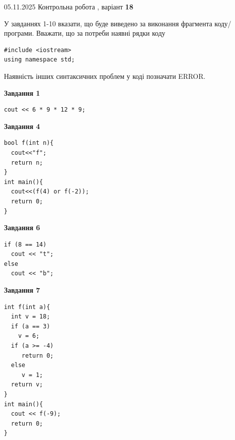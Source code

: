 \documentclass[12pt, ukrainian]{article}
\begin{document}
{\Large{05.11.2025 Контрольна робота , варіант  \No \textbf { 18 }\par}}
{
\begin {large}
У завданнях 1-10 вказати, що буде виведено за виконання фрагмента коду/про\-гра\-ми.
Вважати, що за потреби наявні рядки коду
\begin{verbatim}
#include <iostream>
using namespace std;
\end{verbatim}
Наявність інших синтаксичних проблем у коді позначати ERROR.

\begin{minipage}[t]{7.0cm}

\begin{center}
\textbf{Завдання 1}
\end{center}
\vspace{-8mm}

\begin{verbatim}
cout << 6 * 9 * 12 * 9;
\end{verbatim}



\begin{center}
\textbf{Завдання 4}
\end{center}
\vspace{-8mm}

\begin{verbatim}
bool f(int n){
  cout<<"f";
  return n;
}
int main(){
  cout<<(f(4) or f(-2));
  return 0;
}
\end{verbatim}



\begin{center}
\textbf{Завдання 6}
\end{center}
\vspace{-8mm}

\begin{verbatim}
if (8 == 14)
  cout << "t";
else
  cout << "b";
\end{verbatim}



\begin{center}
\textbf{Завдання 7}
\end{center}
\vspace{-8mm}

\begin{verbatim}
int f(int a){
  int v = 18;
  if (a == 3)
    v = 6;
  if (a >= -4)
     return 0;
  else
     v = 1;
  return v;
}
int main(){
  cout << f(-9);
  return 0;
}
\end{verbatim}


\end{minipage}
\end{large}}
\end{document}
